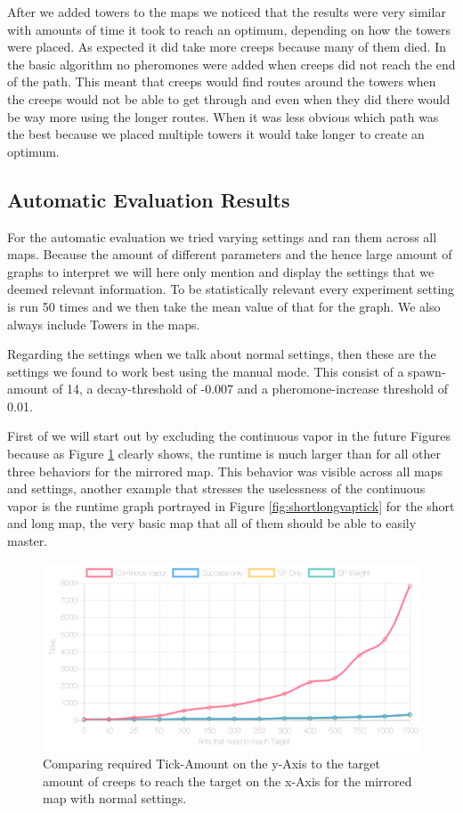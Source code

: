 After we added towers to the maps we noticed that the results were very similar with amounts of time it took to reach an optimum, depending on how the towers were placed. As expected it did take more creeps because many of them died. In the basic algorithm no pheromones were added when creeps did not reach the end of the path. This meant that creeps would find routes around the towers when the creeps would not be able to get through and even when they did there would be way more using the longer routes. When it was less obvious which path was the best because we placed multiple towers it would take longer to create an optimum.

\subsection{Automatic Evaluation Results}
\label{sec:autover}
For the automatic evaluation we tried varying settings and ran them across all maps. Because the amount of different parameters and the hence large amount of graphs to interpret we will here only mention and display the settings that we deemed relevant information. To be statistically relevant every experiment setting is run 50 times and we then take the mean value of that for the graph. We also always include Towers in the maps.

Regarding the settings when we talk about normal settings, then these are the settings we found to work best using the manual mode. This consist of a spawn-amount of 14, a decay-threshold of -0.007 and a pheromone-increase threshold of 0.01.

First of we will start out by excluding the continuous vapor in the future Figures because as Figure \ref{fig:mirrorvaptick} clearly shows, the runtime is much larger than for all other three behaviors for the mirrored map. This behavior was visible across all maps and settings, another example that stresses the uselessness of the continuous vapor is the runtime graph portrayed in Figure \ref{fig:shortlongvaptick} for the short and long map, the very basic map that all of them should be able to easily master.

\begin{figure}[H]
  \centering
  \includegraphics[width=1\linewidth]{images/normalmirroredwithtower-ticks-line}
  \caption{Comparing required Tick-Amount on the y-Axis to the target amount of creeps to reach the target on the x-Axis for the mirrored map with normal settings.}
  \label{fig:mirrorvaptick}
\end{figure}


